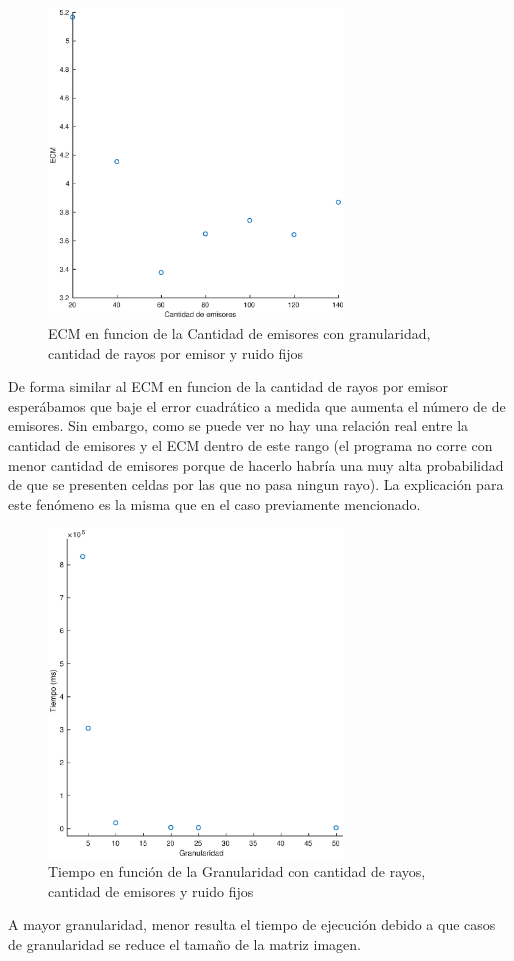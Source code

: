 \begin{figure}[H]
	\centering	\includegraphics[width=0.7\textwidth]{img/emi_ecm}
	\caption{ECM en funcion de la Cantidad de emisores con granularidad, cantidad de rayos por emisor y ruido fijos}
	\label{fig:emi_ecm}
\end{figure}
De forma similar al ECM en funcion de la cantidad de rayos por emisor esperábamos que baje el error cuadrático a medida que aumenta el número de de emisores. Sin embargo, como se puede ver no hay una relación real entre la cantidad de emisores y el ECM dentro de este rango (el programa no corre con menor cantidad de emisores porque de hacerlo habría una muy alta probabilidad de que se presenten celdas por las que no pasa ningun rayo). La explicación para este fenómeno es la misma que en el caso previamente mencionado.

\begin{figure}[H]
	\centering	\includegraphics[width=0.7\textwidth]{img/granu_tiempo}
	\caption{Tiempo en función de la Granularidad con cantidad de rayos, cantidad de emisores y ruido fijos}
	\label{fig:granu_tiempo}
\end{figure}
\par A mayor granularidad, menor resulta el tiempo de ejecuci\'on debido a que casos de granularidad se reduce el tamaño de la matriz imagen.

